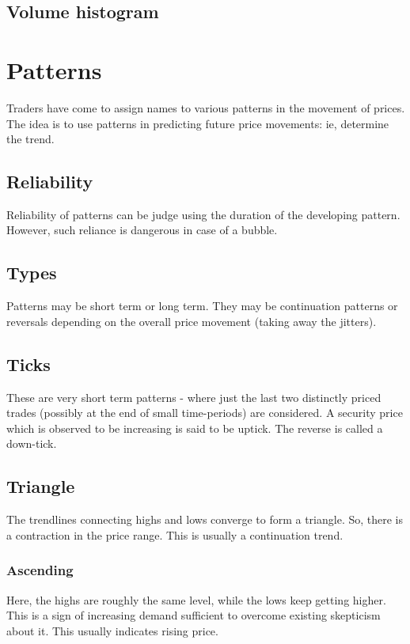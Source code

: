 \documentclass[oneside, article]{memoir}
\begin{document}
\subsection{Volume histogram}
\tbc

\section{Patterns}
Traders have come to assign names to various patterns in the movement of prices. The idea is to use patterns in predicting future price movements: ie, determine the trend.

\subsection{Reliability}
Reliability of patterns can be judge using the duration of the developing pattern. However, such reliance is dangerous in case of a bubble.

\subsection{Types}
Patterns may be short term or long term. They may be continuation patterns or reversals depending on the overall price movement (taking away the jitters).

\subsection{Ticks}
These are very short term patterns  - where just the last two distinctly priced trades (possibly at the end of small time-periods) are considered. A security price which is observed to be increasing is said to be uptick. The reverse is called a down-tick.

\subsection{Triangle}
The trendlines connecting highs and lows converge to form a triangle. So, there is a contraction in the price range. This is usually a continuation trend.

\subsubsection{Ascending}
Here, the highs are roughly the same level, while the lows keep getting higher. This is a sign of increasing demand sufficient to overcome existing skepticism about it. This usually indicates rising price.
\end{document}
